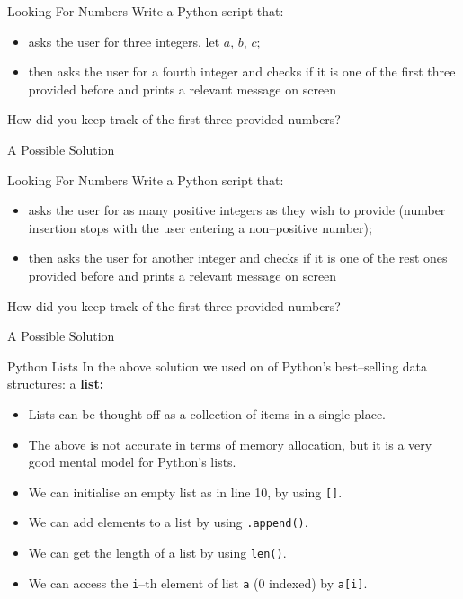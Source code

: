 \documentclass[aspectratio=169, 12pt, xcolor=table]{beamer}
\begin{document}
	\sectionframe
	
	\begin{frame}{Looking For Numbers}
		Write a Python script that:
		\begin{itemize}
			\item asks the user for three integers, let $a$, $b$, $c$;
			\item then asks the user for a fourth integer and checks if it is one of the first three provided before and prints a relevant message on screen
		\end{itemize}
		How did you keep track of the first three provided numbers?
	\end{frame}

	\begin{frame}{A Possible Solution}
		
	\end{frame}

	\begin{frame}{Looking For Numbers}
		Write a Python script that:
		\begin{itemize}
			\item asks the user for as many positive integers as they wish to provide (number insertion stops with the user entering a non--positive number);
			\item then asks the user for another integer and checks if it is one of the rest ones provided before and prints a relevant message on screen
		\end{itemize}
		How did you keep track of the first three provided numbers?
	\end{frame}

	\begin{frame}{A Possible Solution}
		
	\end{frame}

	\begin{frame}{Python Lists}
		In the above solution we used on of Python's best--selling data structures: a \textbf{list:}
		\begin{itemize}
			\item Lists can be thought off as a collection of items in a single place.
			\item The above is not accurate in terms of memory allocation, but it is a very good mental model for Python's lists.
			\item We can initialise an empty list as in line 10, by using \texttt{[]}.
			\item We can add elements to a list by using \texttt{.append()}.
			\item We can get the length of a list by using \texttt{len()}.
			\item We can access the \texttt{i}--th element of list \texttt{a} (0 indexed) by \texttt{a[i]}.
		\end{itemize}
	\end{frame}
\end{document}
